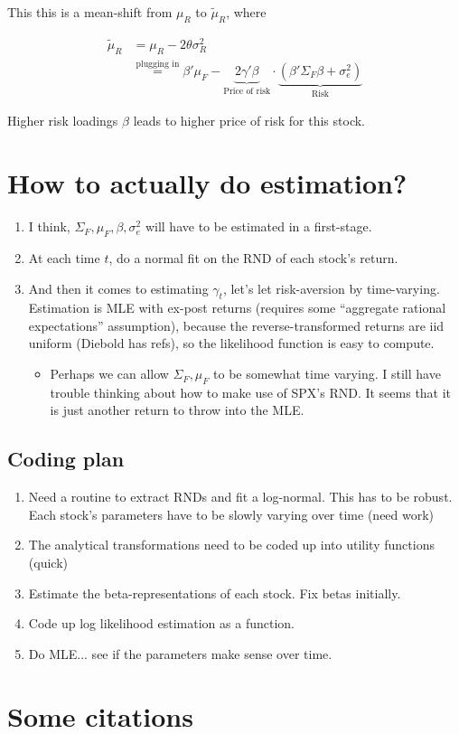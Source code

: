\documentclass[pdftex,12pt,a4paper]{article}
\begin{document}
This this is a mean-shift from $\mu_R$ to $\tilde{\mu}_R$, where

\begin{align}
\tilde{\mu}_R & = \mu_R - 2 \theta \sigma_R^2 \\
& \stackrel{\text{plugging in}}{=} \beta' \mu_F - \underbrace{2 \gamma' \beta}_{\text{Price of risk}} \cdot \underbrace{(\beta' \Sigma_F \beta + \sigma_e^2)}_{\text{Risk}}
\end{align}

Higher risk loadings $\beta$ leads to higher price of risk for this stock. 

\section{How to actually do estimation?}

\begin{enumerate}
\item I think, $\Sigma_F, \mu_F, \beta, \sigma_e^2$ will have to be estimated in a first-stage. 
\item At each time $t$, do a normal fit on the RND of each stock's return. 
\item And then it comes to estimating $\gamma_t$, let's let risk-aversion by time-varying. Estimation is MLE with ex-post returns (requires some ``aggregate rational expectations'' assumption), because the reverse-transformed returns are iid uniform (Diebold has refs), so the likelihood function is easy to compute. 
\begin{itemize}
\item Perhaps we can allow $\Sigma_F, \mu_F$ to be somewhat time varying. I still have trouble thinking about how to make use of SPX's RND. It seems that it is just another return to throw into the MLE. 
\end{itemize}
\end{enumerate}

\subsection{Coding plan}

\begin{enumerate}
\item Need a routine to extract RNDs and fit a log-normal. This has to be robust. Each stock's parameters have to be slowly varying over time (need work)
\item The analytical transformations need to be coded up into utility functions (quick)
\item Estimate the beta-representations of each stock. Fix betas initially. 
\item Code up log likelihood estimation as a function. 
\item Do MLE... see if the parameters make sense over time. 
\end{enumerate}

\section{Some citations}
\end{document}
